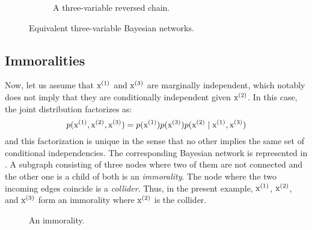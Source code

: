 \begin{figure}
\begin{subfigure}[t]{0.32\textwidth}
{}
        \caption{A three-variable reversed chain.}
        \label{fig:revchain_bayesian_net}
    \end{subfigure}
    \caption{Equivalent three-variable Bayesian networks.}
    \label{fig:equiv_bayesian_nets}
\end{figure}

\subsection{Immoralities}
\label{sec:immoralities}
Now, let us assume that ${\textnormal{x}}^{(1)}$ and ${\textnormal{x}}^{(3)}$ are marginally independent, which notably does not imply that they are conditionally independent given ${\textnormal{x}}^{(2)}$. In this case, the joint distribution factorizes as:
\begin{equation}
    p({\textnormal{x}}^{(1)}, {\textnormal{x}}^{(2)}, {\textnormal{x}}^{(3)}) = p({\textnormal{x}}^{(1)}) p({\textnormal{x}}^{(3)}) p({\textnormal{x}}^{(2)} \mid {\textnormal{x}}^{(1)}, {\textnormal{x}}^{(3)})
\end{equation}
and this factorization is unique in the sense that no other implies the same set of conditional independencies. The corresponding Bayesian network is represented in . A subgraph consisting of three nodes where two of them are not  connected and the other one is a child of both is an \emph{immorality}. The node where the two incoming edges coincide is a \emph{collider}. Thus, in the present example, ${\textnormal{x}}^{(1)}$, ${\textnormal{x}}^{(2)}$, and ${\textnormal{x}}^{(3)}$ form an immorality where ${\textnormal{x}}^{(2)}$ is the collider.

\begin{figure}
    \centering
    \caption{An immorality.}
    \label{fig:immorality_bayesian_net}
\end{figure}

